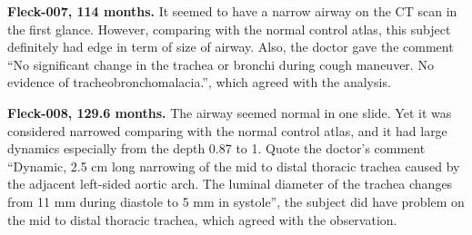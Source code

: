 {\bf Fleck-007, 114 months.}
It seemed to have a narrow airway on the CT scan in the first glance.
However, comparing with the normal control atlas, this subject definitely had edge in term of size of airway. 
Also, the doctor gave the comment ``No significant change in the trachea or bronchi during cough maneuver. No evidence of tracheobronchomalacia.'', which agreed with the analysis.

{\bf Fleck-008, 129.6 months.}
The airway seemed normal in one slide.
Yet it was considered narrowed comparing with the normal control atlas, and it had large dynamics especially from the depth 0.87 to 1.
Quote the doctor's comment ``Dynamic, 2.5 cm long narrowing of the mid to distal thoracic trachea caused by the adjacent left-sided aortic arch. The luminal diameter of the trachea changes from 11 mm during diastole to 5 mm in systole'', the subject did have problem on the mid to distal thoracic trachea, which agreed with the observation.
